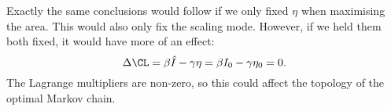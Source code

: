 \documentclass[12pt]{article}
\begin{document}
Exactly the same conclusions would follow if we only fixed $\eta$ when maximising the area. This would also only fix the scaling mode. However, if we held them both fixed, it would have more of an effect:
%
\begin{equation}\label{eq:scaleconstr}
  \Delta \CL = \beta \hat{I} - \gamma \eta = \beta I_0 - \gamma \eta_0 = 0.
\end{equation}
%
The Lagrange multipliers are non-zero, so this could affect the topology of the optimal Markov chain.













\end{document}
